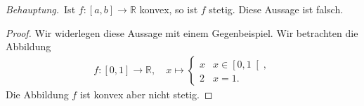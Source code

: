 \documentclass[12pt]{extarticle}
\newcommand{\beh}{\textit{Behauptung.}\ }
\newcommand{\mg}[1]{\mathbb{#1}}
\begin{document}
\beh Ist \(f \colon \left[ a, b \right] \to \mg{R}\)
konvex, so ist \(f\) stetig.  Diese Aussage ist falsch.

\begin{proof}
Wir widerlegen diese Aussage mit einem Gegenbeispiel.
Wir betrachten die Abbildung
\begin{align*}
f \colon \left[ 0, 1 \right] \to \mg{R}, \quad x \mapsto
\begin{cases}
  x & x \in \left[ 0, 1 \right[, \\
  2 & x = 1.
\end{cases}
\end{align*}
Die Abbildung \(f\) ist konvex aber nicht stetig.
\end{proof}
\end{document}
